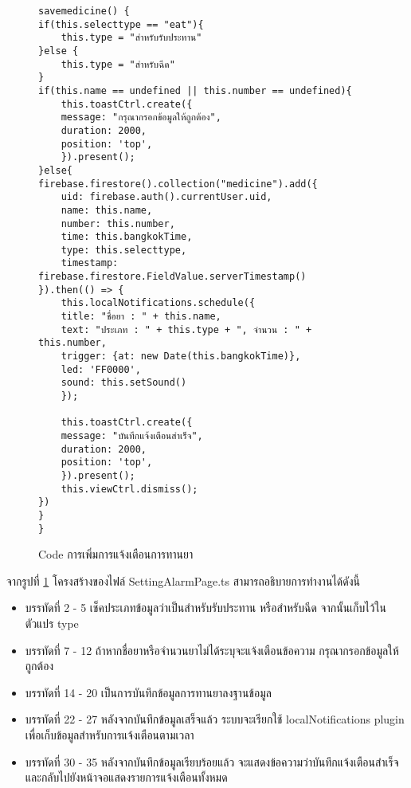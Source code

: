 \begin{figure}[H]
{\lstset{language=Pascal}
\begin{lstlisting}
savemedicine() {
if(this.selecttype == "eat"){
	this.type = "สำหรับรับประทาน"
}else {
	this.type = "สำหรับฉีด"
}
if(this.name == undefined || this.number == undefined){
	this.toastCtrl.create({
	message: "กรุณากรอกข้อมูลให้ถูกต้อง",
	duration: 2000,
	position: 'top',
	}).present();
}else{
firebase.firestore().collection("medicine").add({
	uid: firebase.auth().currentUser.uid,
	name: this.name,
	number: this.number,
	time: this.bangkokTime,
	type: this.selecttype,
	timestamp: firebase.firestore.FieldValue.serverTimestamp()
}).then(() => {
	this.localNotifications.schedule({
	title: "ชื่อยา : " + this.name,
	text: "ประเภท : " + this.type + ", จำนวน : " + this.number,
	trigger: {at: new Date(this.bangkokTime)},
	led: 'FF0000',
	sound: this.setSound()
	});

	this.toastCtrl.create({
	message: "บันทึกแจ้งเตือนสำเร็จ",
	duration: 2000,
	position: 'top',
	}).present();
	this.viewCtrl.dismiss();
})
}
}
\end{lstlisting}}
\caption{Code การเพิ่มการแจ้งเตือนการทานยา}
\label{Fig:4-alarm}
\end{figure}
\newpage

จากรูปที่ \ref{Fig:4-alarm} โครงสร้างของไฟล์ SettingAlarmPage.ts สามารถอธิบายการทำงานได้ดังนี้
\begin{itemize}[label={--}]
\item บรรทัดที่ 2 - 5 เช็คประเภทข้อมูลว่าเป็นสำหรับรับประทาน หรือสำหรับฉีด จากนั้นเก็บไว้ในตัวแปร type
\item บรรทัดที่ 7 - 12 ถ้าหากชื่อยาหรือจำนวนยาไม่ได้ระบุจะแจ้งเตือนข้อความ กรุณากรอกข้อมูลให้ถูกต้อง
\item บรรทัดที่ 14 - 20 เป็นการบันทึกข้อมูลการทานยาลงฐานข้อมูล
\item บรรทัดที่ 22 - 27 หลังจากบันทึกข้อมูลเสร็จแล้ว ระบบจะเรียกใช้ localNotifications plugin เพื่อเก็บข้อมูลสำหรับการแจ้งเตือนตามเวลา
\item บรรทัดที่ 30 - 35 หลังจากบันทึกข้อมูลเรียบร้อยแล้ว จะแสดงข้อความว่าบันทึกแจ้งเตือนสำเร็จ และกลับไปยังหน้าจอแสดงรายการแจ้งเตือนทั้งหมด
\end{itemize}
\newpage




